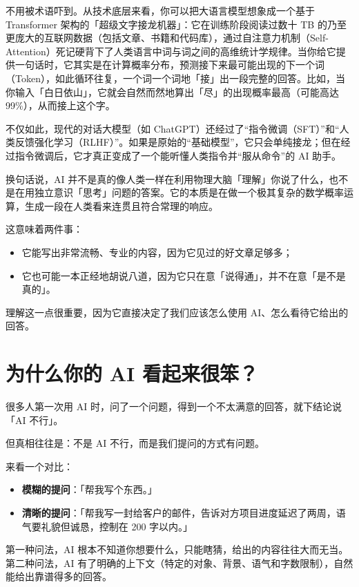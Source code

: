 不用被术语吓到。从技术底层来看，你可以把大语言模型想象成一个基于 Transformer 架构的「超级文字接龙机器」：它在训练阶段阅读过数十 TB 的乃至更庞大的互联网数据（包括文章、书籍和代码库），通过自注意力机制（Self-Attention）死记硬背下了人类语言中词与词之间的高维统计学规律。当你给它提供一句话时，它其实是在计算概率分布，预测接下来最可能出现的下一个词（Token），如此循环往复，一个词一个词地「接」出一段完整的回答。比如，当你输入「白日依山」，它就会自然而然地算出「尽」的出现概率最高（可能高达 99\%），从而接上这个字。

不仅如此，现代的对话大模型（如 ChatGPT）还经过了“指令微调（SFT）”和“人类反馈强化学习（RLHF）”。如果是原始的“基础模型”，它只会单纯接龙；但在经过指令微调后，它才真正变成了一个能听懂人类指令并“服从命令”的 AI 助手。

换句话说，AI 并不是真的像人类一样在利用物理大脑「理解」你说了什么，也不是在用独立意识「思考」问题的答案。它的本质是在做一个极其复杂的数学概率运算，生成一段在人类看来连贯且符合常理的响应。

这意味着两件事：

\begin{itemize}
  \item 它能写出非常流畅、专业的内容，因为它见过的好文章足够多；
  \item 它也可能一本正经地胡说八道，因为它只在意「说得通」，并不在意「是不是真的」。
\end{itemize}

理解这一点很重要，因为它直接决定了我们应该怎么使用 AI、怎么看待它给出的回答。

\section{为什么你的 AI 看起来很笨？}

很多人第一次用 AI 时，问了一个问题，得到一个不太满意的回答，就下结论说「AI 不行」。

但真相往往是：不是 AI 不行，而是我们提问的方式有问题。

来看一个对比：

\begin{itemize}
  \item \textbf{模糊的提问}：「帮我写个东西。」
  \item \textbf{清晰的提问}：「帮我写一封给客户的邮件，告诉对方项目进度延迟了两周，语气要礼貌但诚恳，控制在 200 字以内。」
\end{itemize}

第一种问法，AI 根本不知道你想要什么，只能瞎猜，给出的内容往往大而无当。第二种问法，AI 有了明确的上下文（特定的对象、背景、语气和字数限制），自然能给出靠谱得多的回答。

